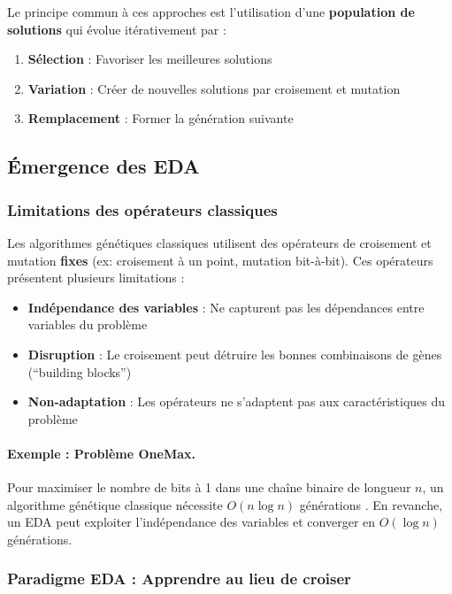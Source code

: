 \documentclass[12pt,a4paper]{article}
\theoremstyle{definition}
\theoremstyle{remark}
\begin{document}
Le principe commun à ces approches est l'utilisation d'une \textbf{population de solutions} qui évolue itérativement par :
\begin{enumerate}
    \item \textbf{Sélection} : Favoriser les meilleures solutions
    \item \textbf{Variation} : Créer de nouvelles solutions par croisement et mutation
    \item \textbf{Remplacement} : Former la génération suivante
\end{enumerate}

\subsection{Émergence des EDA}

\subsubsection{Limitations des opérateurs classiques}

Les algorithmes génétiques classiques utilisent des opérateurs de croisement et mutation \textbf{fixes} (ex: croisement à un point, mutation bit-à-bit). Ces opérateurs présentent plusieurs limitations \cite{pelikan2002survey} :

\begin{itemize}
    \item \textbf{Indépendance des variables} : Ne capturent pas les dépendances entre variables du problème
    
    \item \textbf{Disruption} : Le croisement peut détruire les bonnes combinaisons de gènes (``building blocks'')
    
    \item \textbf{Non-adaptation} : Les opérateurs ne s'adaptent pas aux caractéristiques du problème
\end{itemize}

\paragraph{Exemple : Problème OneMax.}
Pour maximiser le nombre de bits à 1 dans une chaîne binaire de longueur $n$, un algorithme génétique classique nécessite $O(n \log n)$ générations \cite{muhlenbein1992gene}. En revanche, un EDA peut exploiter l'indépendance des variables et converger en $O(\log n)$ générations.

\subsubsection{Paradigme EDA : Apprendre au lieu de croiser}
\end{document}
